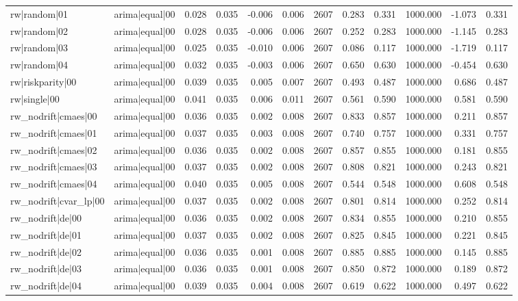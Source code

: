 \begin{table}
\begin{tabular}{llrrrrrrrrrr}
rw|random|01 & arima|equal|00 & 0.028 & 0.035 & -0.006 & 0.006 & 2607 & 0.283 & 0.331 & 1000.000 & -1.073 & 0.331 \\
rw|random|02 & arima|equal|00 & 0.028 & 0.035 & -0.006 & 0.006 & 2607 & 0.252 & 0.283 & 1000.000 & -1.145 & 0.283 \\
rw|random|03 & arima|equal|00 & 0.025 & 0.035 & -0.010 & 0.006 & 2607 & 0.086 & 0.117 & 1000.000 & -1.719 & 0.117 \\
rw|random|04 & arima|equal|00 & 0.032 & 0.035 & -0.003 & 0.006 & 2607 & 0.650 & 0.630 & 1000.000 & -0.454 & 0.630 \\
rw|riskparity|00 & arima|equal|00 & 0.039 & 0.035 & 0.005 & 0.007 & 2607 & 0.493 & 0.487 & 1000.000 & 0.686 & 0.487 \\
rw|single|00 & arima|equal|00 & 0.041 & 0.035 & 0.006 & 0.011 & 2607 & 0.561 & 0.590 & 1000.000 & 0.581 & 0.590 \\
rw\_nodrift|cmaes|00 & arima|equal|00 & 0.036 & 0.035 & 0.002 & 0.008 & 2607 & 0.833 & 0.857 & 1000.000 & 0.211 & 0.857 \\
rw\_nodrift|cmaes|01 & arima|equal|00 & 0.037 & 0.035 & 0.003 & 0.008 & 2607 & 0.740 & 0.757 & 1000.000 & 0.331 & 0.757 \\
rw\_nodrift|cmaes|02 & arima|equal|00 & 0.036 & 0.035 & 0.002 & 0.008 & 2607 & 0.857 & 0.855 & 1000.000 & 0.181 & 0.855 \\
rw\_nodrift|cmaes|03 & arima|equal|00 & 0.037 & 0.035 & 0.002 & 0.008 & 2607 & 0.808 & 0.821 & 1000.000 & 0.243 & 0.821 \\
rw\_nodrift|cmaes|04 & arima|equal|00 & 0.040 & 0.035 & 0.005 & 0.008 & 2607 & 0.544 & 0.548 & 1000.000 & 0.608 & 0.548 \\
rw\_nodrift|cvar\_lp|00 & arima|equal|00 & 0.037 & 0.035 & 0.002 & 0.008 & 2607 & 0.801 & 0.814 & 1000.000 & 0.252 & 0.814 \\
rw\_nodrift|de|00 & arima|equal|00 & 0.036 & 0.035 & 0.002 & 0.008 & 2607 & 0.834 & 0.855 & 1000.000 & 0.210 & 0.855 \\
rw\_nodrift|de|01 & arima|equal|00 & 0.037 & 0.035 & 0.002 & 0.008 & 2607 & 0.825 & 0.845 & 1000.000 & 0.221 & 0.845 \\
rw\_nodrift|de|02 & arima|equal|00 & 0.036 & 0.035 & 0.001 & 0.008 & 2607 & 0.885 & 0.885 & 1000.000 & 0.145 & 0.885 \\
rw\_nodrift|de|03 & arima|equal|00 & 0.036 & 0.035 & 0.001 & 0.008 & 2607 & 0.850 & 0.872 & 1000.000 & 0.189 & 0.872 \\
rw\_nodrift|de|04 & arima|equal|00 & 0.039 & 0.035 & 0.004 & 0.008 & 2607 & 0.619 & 0.622 & 1000.000 & 0.497 & 0.622 \\

\end{tabular}
\end{table}
